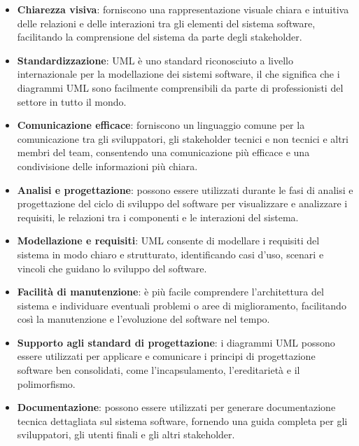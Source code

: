 \begin{itemize}
	\item \textbf{Chiarezza visiva}: forniscono una rappresentazione visuale chiara e intuitiva delle relazioni e delle interazioni tra gli elementi del sistema software, facilitando la comprensione del sistema da parte degli stakeholder.
	\item \textbf{Standardizzazione}: UML è uno standard riconosciuto a livello internazionale per la modellazione dei sistemi software, il che significa che i diagrammi UML sono facilmente comprensibili da parte di professionisti del settore in tutto il mondo.
	\item \textbf{Comunicazione efficace}: forniscono un linguaggio comune per la comunicazione tra gli sviluppatori, gli stakeholder tecnici e non tecnici e altri membri del team, consentendo una comunicazione più efficace e una condivisione delle informazioni più chiara.
	\item \textbf{Analisi e progettazione}: possono essere utilizzati durante le fasi di analisi e progettazione del ciclo di sviluppo del software per visualizzare e analizzare i requisiti, le relazioni tra i componenti e le interazioni del sistema.
	\item \textbf{Modellazione e requisiti}: UML consente di modellare i requisiti del sistema in modo chiaro e strutturato, identificando casi d'uso, scenari e vincoli che guidano lo sviluppo del software.
	\item \textbf{Facilità di manutenzione}: è più facile comprendere l'architettura del sistema e individuare eventuali problemi o aree di miglioramento, facilitando così la manutenzione e l'evoluzione del software nel tempo.
	\item \textbf{Supporto agli standard di progettazione}: i diagrammi UML possono essere utilizzati per applicare e comunicare i principi di progettazione software ben consolidati, come l'incapsulamento, l'ereditarietà e il polimorfismo.
	\item \textbf{Documentazione}: possono essere utilizzati per generare documentazione tecnica dettagliata sul sistema software, fornendo una guida completa per gli sviluppatori, gli utenti finali e gli altri stakeholder.
\end{itemize}

